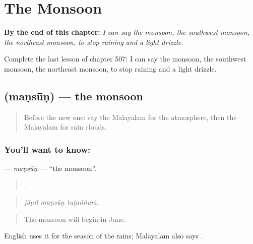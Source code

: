
\chapter{The Monsoon}
\label{ch:ml-the-monsoon}

\begin{chapteropening}
\textbf{By the end of this chapter:} \emph{I can say the monsoon, the southwest monsoon, the northeast monsoon, to stop raining and a light drizzle.}

Complete the last lesson of chapter 507: I can say the monsoon, the southwest monsoon, the northeast monsoon, to stop raining and a light drizzle.
\end{chapteropening}

\section[\texorpdfstring{\ml{മൺസൂൺ} (maṇsūṇ)}{മൺസൂൺ (maṇsūṇ)}]{ (maṇsūṇ) — the monsoon}

\label{lesson:ML-C507-mansun}



\begin{quote}
Before the new one: say the Malayalam for the atmosphere, then the Malayalam for rain clouds.
\end{quote}

\subsection*{You'll want to know: }
\textbf{} — \emph{maṇsūṇ} — \textquotedblleft{}the monsoon\textquotedblright{}.

\begin{quote}
  .
\end{quote}

\begin{quote}
\emph{jūṇil maṇsūṇ tuṭaṅṅuṁ.}
\end{quote}

\begin{quote}
The monsoon will begin in June.
\end{quote}

English uses it for the season of the rains; Malayalam also says .

